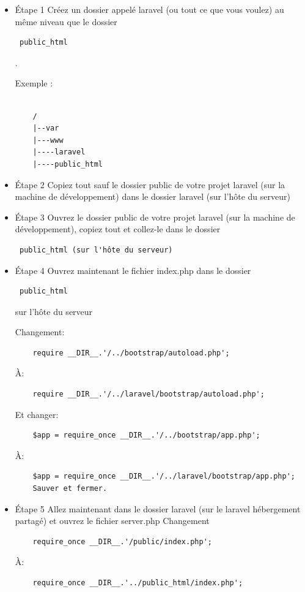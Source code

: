 \begin{itemize}
	\item Étape 1
	Créez un dossier appelé laravel (ou tout ce que vous voulez) au même niveau que le dossier\begin{verbatim} public_html \end{verbatim}.
	
	Exemple :
	
	\begin{verbatim}
	
	/
	|--var
	|---www
	|----laravel
	|----public_html
	\end{verbatim}
	
	
	\item Étape 2
	Copiez tout sauf le dossier public de votre projet laravel (sur la machine de développement) dans
	le dossier laravel (sur l'hôte du serveur)
	
	\item Étape 3
	Ouvrez le dossier public de votre projet laravel (sur la machine de développement), copiez tout et
	collez-le dans le dossier \begin{verbatim} public_html (sur l'hôte du serveur)
	\end{verbatim}
	\item Étape 4
	Ouvrez maintenant le fichier index.php dans le dossier \begin{verbatim} public_html \end{verbatim}  sur l'hôte du serveur
	
	Changement:
	\begin{verbatim}
	require __DIR__.'/../bootstrap/autoload.php';
	\end{verbatim}
	À:
	\begin{verbatim}
	require __DIR__.'/../laravel/bootstrap/autoload.php';
	\end{verbatim}
	Et changer:
	\begin{verbatim}
	$app = require_once __DIR__.'/../bootstrap/app.php';
	\end{verbatim}
	À:
	\begin{verbatim}
	$app = require_once __DIR__.'/../laravel/bootstrap/app.php';
	Sauver et fermer.
	\end{verbatim}
	
	\item Étape 5
	Allez maintenant dans le dossier laravel (sur le laravel hébergement partagé) et ouvrez le fichier server.php
	Changement
	\begin{verbatim}
	require_once __DIR__.'/public/index.php';
	\end{verbatim}
	À:
	\begin{verbatim}
	require_once __DIR__.'../public_html/index.php';
	\end{verbatim}
	

\end{itemize}
